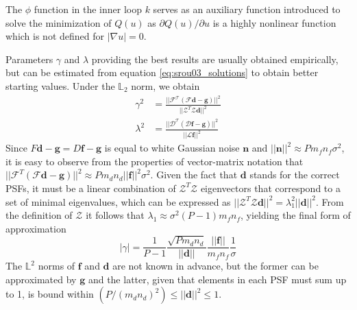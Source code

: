 \documentclass[12pt,notitlepage]{report}
\begin{document}
The $\phi$ function in the inner loop $k$ serves as an auxiliary function introduced to solve the minimization of $Q(u)$ as $\partial Q(u) / \partial u$ is a highly nonlinear function which is not defined for $|\nabla u| = 0$. 

Parameters $\gamma$ and $\lambda$ providing the best results are usually obtained empirically, but can be estimated from equation \ref{eq:srou03_solutions} to obtain better starting values. Under the $\mathbb{L}_2$ norm, we obtain
\begin{equation}
\label{eq:srou03_gamma_lambda}
	\begin{aligned}
		\gamma^2  &= \frac{ ||\mathcal{F}^\mathcal{T}(\mathcal{F} \mathbf{d} - \mathbf{g}) ||^2 }{ || \mathcal{Z}^T \mathcal{Z} \mathbf{d} ||^2} \\
		\lambda^2 &= \frac{ ||\mathcal{D}^\mathcal{T}(\mathcal{D} \mathbf{f} - \mathbf{g}) ||^2 }{ || \mathcal{L}   \mathbf {f} ||^2}   	
	\end{aligned}
\end{equation}
Since $F \mathbf{d} - \mathbf{g} = D \mathbf{f} - \mathbf{g}$ is equal to white Gaussian noise $\mathbf{n}$ and $||\mathbf{n}||^2 \approx P m_f n_f \sigma^2$, it is easy to observe from the properties of vector-matrix notation that $||\mathcal{F}^T(\mathcal{F} \mathbf{d} - \mathbf{g}) ||^2 \approx P m_d n_d ||\mathbf{f}||^2 \sigma^2$. Given the fact that $\mathbf{d}$ stands for the correct PSFs, it must be a linear combination of $\mathcal{Z}^T \mathcal{Z} $ eigenvectors that correspond to a set of minimal eigenvalues, which can be expressed as $||\mathcal{Z}^T \mathcal{Z} \mathbf{d}||^2 = \lambda_1^2 ||\mathbf{d}||^2$. From the definition of $\mathcal{Z}$ it follows that $\lambda_1 \approx \sigma^2 (P-1) m_f n_f$, yielding the final form of approximation 
\begin{equation}
\label{eq:srou03_gamma_estimate}
	|\gamma| = \frac{1}{P - 1} \frac{\sqrt{P m_d n_d}}{|| \mathbf{d} ||} \frac{||\mathbf{f}||}{m_f n_f} \frac{1}{\sigma}
\end{equation}
The $\mathbb{L}^2$ norms of $\mathbf{f}$ and $\mathbf{d}$ are not known in advance, but the former can be approximated by $\mathbf{g}$ and the latter, given that elements in each PSF must sum up to 1, is bound within $(P / (m_d n_d)^2) \leq || \mathbf{d} ||^2 \leq 1$. 
\end{document}
